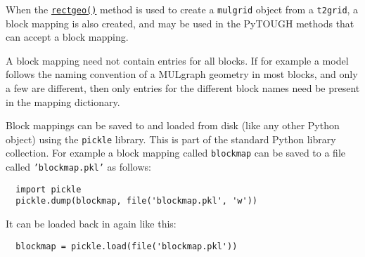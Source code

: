 When the \hyperref[sec:t2grid:rectgeo]{\texttt{rectgeo()}} method is used to create a \texttt{mulgrid} object from a \texttt{t2grid}, a block mapping is also created, and may be used in the PyTOUGH methods that can accept a block mapping.

A block mapping need not contain entries for all blocks. If for example a model follows the naming convention of a MULgraph geometry in most blocks, and only a few are different, then only entries for the different block names need be present in the mapping dictionary.

Block mappings can be saved to and loaded from disk (like any other Python object) using the \texttt{pickle} library. This is part of the standard Python library collection. For example a block mapping called \texttt{blockmap} can be saved to a file called \texttt{'blockmap.pkl'} as follows:

\begin{lstlisting}
  import pickle
  pickle.dump(blockmap, file('blockmap.pkl', 'w'))
\end{lstlisting}

It can be loaded back in again like this:

\begin{lstlisting}
  blockmap = pickle.load(file('blockmap.pkl'))
\end{lstlisting}

